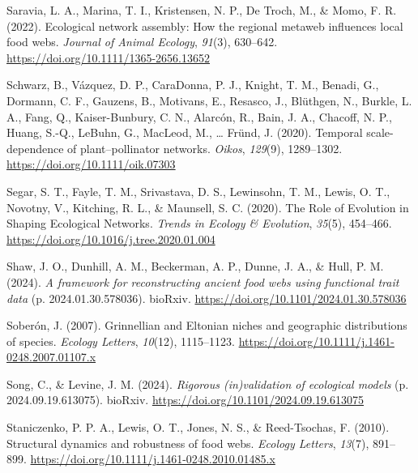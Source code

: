 \documentclass[
]{article}
\newlength{\cslhangindent}
\newenvironment{CSLReferences}[2] %
 {\begin{list}{}{%
  \setlength{\itemindent}{0pt}
  \setlength{\leftmargin}{0pt}
  \setlength{\parsep}{0pt}
  \ifodd #1
   \setlength{\leftmargin}{\cslhangindent}
   \setlength{\itemindent}{-1\cslhangindent}
  \fi
  \setlength{\itemsep}{#2\baselineskip}}}
 {\end{list}}
\begin{document}
\begin{CSLReferences}{1}{0}
Saravia, L. A., Marina, T. I., Kristensen, N. P., De Troch, M., \& Momo,
F. R. (2022). Ecological network assembly: {How} the regional metaweb
influences local food webs. \emph{Journal of Animal Ecology},
\emph{91}(3), 630--642. \url{https://doi.org/10.1111/1365-2656.13652}

Schwarz, B., Vázquez, D. P., CaraDonna, P. J., Knight, T. M., Benadi,
G., Dormann, C. F., Gauzens, B., Motivans, E., Resasco, J., Blüthgen,
N., Burkle, L. A., Fang, Q., Kaiser-Bunbury, C. N., Alarcón, R., Bain,
J. A., Chacoff, N. P., Huang, S.-Q., LeBuhn, G., MacLeod, M., \ldots{}
Fründ, J. (2020). Temporal scale-dependence of plant--pollinator
networks. \emph{Oikos}, \emph{129}(9), 1289--1302.
\url{https://doi.org/10.1111/oik.07303}

Segar, S. T., Fayle, T. M., Srivastava, D. S., Lewinsohn, T. M., Lewis,
O. T., Novotny, V., Kitching, R. L., \& Maunsell, S. C. (2020). The
{Role} of {Evolution} in {Shaping Ecological Networks}. \emph{Trends in
Ecology \& Evolution}, \emph{35}(5), 454--466.
\url{https://doi.org/10.1016/j.tree.2020.01.004}

Shaw, J. O., Dunhill, A. M., Beckerman, A. P., Dunne, J. A., \& Hull, P.
M. (2024). \emph{A framework for reconstructing ancient food webs using
functional trait data} (p. 2024.01.30.578036). bioRxiv.
\url{https://doi.org/10.1101/2024.01.30.578036}

Soberón, J. (2007). Grinnellian and {Eltonian} niches and geographic
distributions of species. \emph{Ecology Letters}, \emph{10}(12),
1115--1123. \url{https://doi.org/10.1111/j.1461-0248.2007.01107.x}

Song, C., \& Levine, J. M. (2024). \emph{Rigorous (in)validation of
ecological models} (p. 2024.09.19.613075). bioRxiv.
\url{https://doi.org/10.1101/2024.09.19.613075}

Staniczenko, P. P. A., Lewis, O. T., Jones, N. S., \& Reed-Tsochas, F.
(2010). Structural dynamics and robustness of food webs. \emph{Ecology
Letters}, \emph{13}(7), 891--899.
\url{https://doi.org/10.1111/j.1461-0248.2010.01485.x}


\end{CSLReferences}
\end{document}
